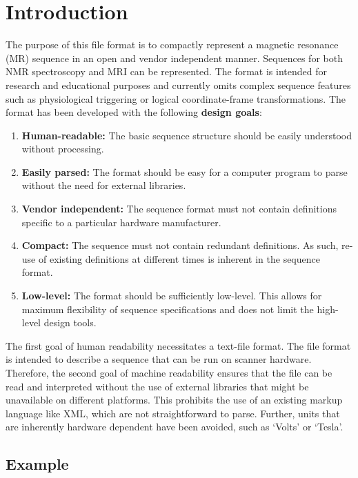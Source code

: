 \documentclass{article}
\begin{document}
\section{Introduction}
The purpose of this file format is to compactly represent a magnetic resonance (MR) sequence in an open and vendor independent manner. Sequences for both NMR spectroscopy and MRI can be represented. The format is intended for research and educational purposes and currently omits complex sequence features such as physiological triggering or logical coordinate-frame transformations. The format has been developed with the following \textbf{design goals}:
\begin{enumerate}
\item \textbf{Human-readable:} The basic sequence structure should be easily understood without processing.
\item \textbf{Easily parsed:} The format should be easy for a computer program to parse without the need for external libraries.
\item \textbf{Vendor independent:} The sequence format must not contain definitions specific to a particular hardware manufacturer.
\item \textbf{Compact:} The sequence must not contain redundant definitions. As such, re-use of existing definitions at different times is inherent in the sequence format.
\item \textbf{Low-level:} The format should be sufficiently low-level. This allows for maximum flexibility of sequence specifications and does not limit the high-level design tools.
\end{enumerate}

The first goal of human readability necessitates a text-file format. The file format is intended to describe a sequence that can be run on scanner hardware. Therefore, the second goal of machine readability ensures that the file can be read and interpreted without the use of external libraries that might be unavailable on different platforms. This prohibits the use of an existing markup language like XML, which are not straightforward to parse. Further, units  that are inherently hardware dependent have been avoided, such as `Volts' or `Tesla'.


\subsection{Example}
\end{document}
